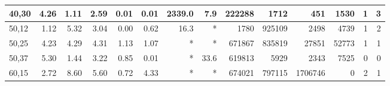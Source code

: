 \documentclass[smallextended]{svjour3hack}       %
\begin{document}
\begin{table}[!ht]
\begin{tabular}{l|rrr|rr|rr|rr|rr|rr}
40,30                                               & 4.26                              & 1.11                         & 2.59                     & 0.01                              & 0.01                          & 2339.0                            & 7.9                           & 222288                             & 1712                          & 451                                     & 1530                               & 1                                 & 3                            \\ \hline
50,12                                               & 1.12                              & 5.32                         & 3.04                     & 0.00                              & 0.62                          & 16.3                              & *                             & 1780                               & 925109                        & 2498                                    & 4739                               & 1                                 & 2                            \\
50,25                                               & 4.23                              & 4.29                         & 4.31                     & 1.13                              & 1.07                          & *                                 & *                             & 671867                             & 835819                        & 27851                                   & 52773                              & 1                                 & 1                            \\
50,37                                               & 5.30                              & 1.44                         & 3.22                     & 0.85                              & 0.01                          & *                                 & 33.6                          & 619813                             & 5929                          & 2343                                    & 7525                               & 0                                 & 0                            \\ \hline
60,15                                               & 2.72                              & 8.60                         & 5.60                     & 0.72                              & 4.33                          & *                                 & *                             & 674021                             & 797115                        & 1706746                                 & 0                                  & 2                                 & 1                            \\

\end{tabular}
\end{table}
\end{document}
